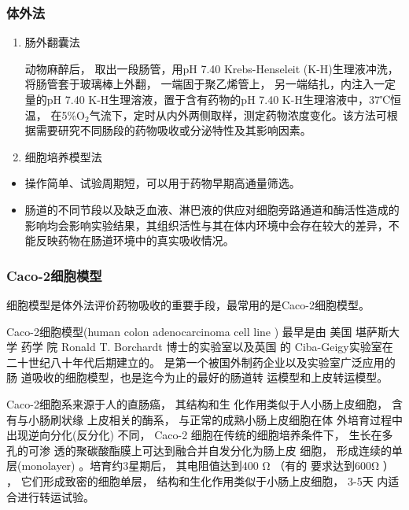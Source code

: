 \begin{frame}
    \frametitle{体外法}
    \begin{enumerate}
        \item 肠外翻囊法
        
        动物麻醉后， 取出一段肠管，用pH 7.40 Krebs-Henseleit (K-H)生理液冲洗，将肠管套于玻璃棒上外翻， 一端固于聚乙烯管上， 另一端结扎，内注入一定量的pH 7.40 K-H生理溶液，置于含有药物的pH 7.40 K-H生理溶液中，37℃恒温， 在5\%O$_2$气流下，定时从内外两侧取样，测定药物浓度变化。该方法可根据需要研究不同肠段的药物吸收或分泌特性及其影响因素。
        \item 细胞培养模型法
      \end{enumerate}
      \begin{itemize}
        \item 操作简单、试验周期短，可以用于药物早期高通量筛选。
        \item 肠道的不同节段以及缺乏血液、淋巴液的供应对细胞旁路通道和酶活性造成的影响均会影响实验结果，其组织活性与其在体内环境中会存在较大的差异，不能反映药物在肠道环境中的真实吸收情况。
      \end{itemize}
\end{frame}


\begin{frame}
    \frametitle{Caco-2细胞模型}
    细胞模型是体外法评价药物吸收的重要手段，最常用的是Caco-2细胞模型。

    Caco-2细胞模型(human colon adenocarcinoma
cell line ) 最早是由 美国 堪萨斯大学 药学 院
Ronald T. Borchardt 博士的实验室以及英国 的
Ciba-Geigy实验室在二十世纪八十年代后期建立的。
是第一个被国外制药企业以及实验室广泛应用的肠
道吸收的细胞模型，也是迄今为止的最好的肠道转
运模型和上皮转运模型。

Caco-2细胞系来源于人的直肠癌， 其结构和生
化作用类似于人小肠上皮细胞， 含有与小肠刷状缘
上皮相关的酶系， 与正常的成熟小肠上皮细胞在体
外培育过程中出现逆向分化(反分化) 不同， Caco-2
细胞在传统的细胞培养条件下， 生长在多孔的可渗
透的聚碳酸酯膜上可达到融合并自发分化为肠上皮
细胞， 形成连续的单层(monolayer) 。培育约3星期后， 其电阻值达到400 Ω （有的
要求达到600Ω ） ， 它们形成致密的细胞单层，
结构和生化作用类似于小肠上皮细胞， 3-5天
内适合进行转运试验。
\end{frame}





